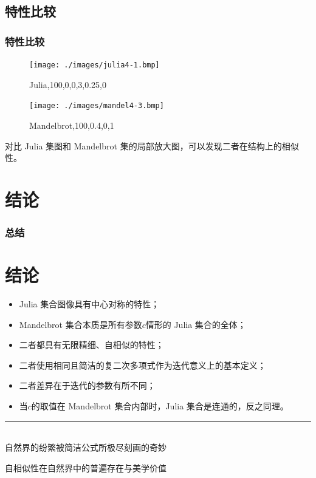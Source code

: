\documentclass[8pt,c,compress,UTF8]{ctexbeamer}
\begin{document}
\subsection{特性比较}
\begin{frame} 
\frametitle{特性比较}

\begin{figure}[htb]
\centering
\begin{minipage}{0.4\linewidth}
\centering
\texttt{[image: ./images/julia4-1.bmp]}
\caption*{Julia,100,0,0,3,0.25,0}
\label{fig4-1}
\end{minipage}\hfill
\begin{minipage}{0.4\linewidth}
\centering
\texttt{[image: ./images/mandel4-3.bmp]}
\caption*{Mandelbrot,100,0.4,0,1}
\label{fig4-2}
\end{minipage}
\end{figure}
对比 Julia 集图和 Mandelbrot 集的局部放大图，可以发现二者在结构上的相似性。
\end{frame}

\section{结论}
\begin{frame} 
\frametitle{总结}
\section{结论}
\begin{itemize}
    \item Julia 集合图像具有中心对称的特性；
    \item Mandelbrot 集合本质是所有参数$c$情形的 Julia 集合的全体；
    \item 二者都具有无限精细、自相似的特性；
    \item 二者使用相同且简洁的复二次多项式作为迭代意义上的基本定义；
    \item 二者差异在于迭代的参数有所不同；
    \item 当$c$的取值在 Mandelbrot 集合内部时，Julia 集合是连通的，反之同理。
\end{itemize}
{\noindent}  \rule[-10pt]{12.2cm}{0.05em}\\
\centering
自然界的纷繁被简洁公式所极尽刻画的奇妙

自相似性在自然界中的普遍存在与美学价值

\end{frame}
\end{document}
